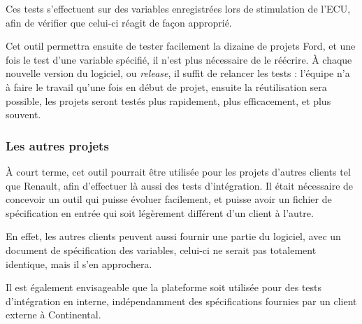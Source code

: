 	Ces tests s'effectuent sur des variables enregistrées lors de stimulation de l'ECU, afin de vérifier que celui-ci réagit de façon approprié.

	Cet outil permettra ensuite de tester facilement la dizaine de projets Ford, et une fois le test d'une variable spécifié, il n'est plus nécessaire de le réécrire. À chaque nouvelle version du logiciel, ou \textit{release}, il suffit de relancer les tests : l'équipe n'a à faire le travail qu'une fois en début de projet, ensuite la réutilisation sera possible, les projets seront testés plus rapidement, plus efficacement, et plus souvent.

	\subsubsection{Les autres projets}
	À court terme, cet outil pourrait être utilisée pour les projets d'autres clients tel que Renault, afin d'effectuer là aussi des tests d'intégration. Il était nécessaire de concevoir un outil qui puisse évoluer facilement, et puisse avoir un fichier de spécification en entrée qui soit légèrement différent d'un client à l'autre.

	En effet, les autres clients peuvent aussi fournir une partie du logiciel, avec un document de spécification des variables, celui-ci ne serait pas totalement identique, mais il s'en approchera.

	Il est également envisageable que la plateforme soit utilisée pour des tests d'intégration en interne, indépendamment des spécifications fournies par un client externe à Continental.
%
%
%	
